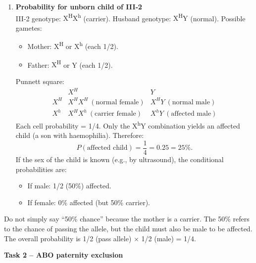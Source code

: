 \documentclass[11pt]{article}
\newcommand{\cle}[1]{{\popxbold\color{popdark}#1}}
\begin{document}
\begin{enumerate}
\begin{itemize}
    \end{itemize}
    \item \textbf{Probability for unborn child of III‑2}\\
    III‑2 genotype: \cle{X\textsuperscript{H}X\textsuperscript{h}} (carrier). Husband genotype: \cle{X\textsuperscript{H}Y} (normal).
    Possible gametes:
    \begin{itemize}
        \item Mother: \cle{X\textsuperscript{H}} or \cle{X\textsuperscript{h}} (each 1/2).
        \item Father: \cle{X\textsuperscript{H}} or \cle{Y} (each 1/2).
    \end{itemize}
    Punnett square:
    \[
    \begin{array}{c|cc}
    & X^H & Y \\ \hline
    X^H & X^HX^H\ (\text{normal female}) & X^HY\ (\text{normal male}) \\
    X^h & X^HX^h\ (\text{carrier female}) & X^hY\ (\text{affected male})
    \end{array}
    \]
    Each cell probability = 1/4. Only the \cle{X\textsuperscript{h}Y} combination yields an affected child (a son with haemophilia). Therefore:
    \[
    P(\text{affected child}) = \frac{1}{4} = 0.25 = 25\%.
    \]
    If the sex of the child is known (e.g., by ultrasound), the conditional probabilities are:
    \begin{itemize}
        \item If male: 1/2 (50\%) affected.
        \item If female: 0\% affected (but 50\% carrier).
    \end{itemize}
\end{enumerate}

\begin{attention}
Do not simply say “50\% chance” because the mother is a carrier. The 50\% refers to the chance of passing the allele, but the child must also be male to be affected. The overall probability is 1/2 (pass allele) × 1/2 (male) = 1/4.
\end{attention}

\textbf{Task 2 – ABO paternity exclusion}
\end{document}
